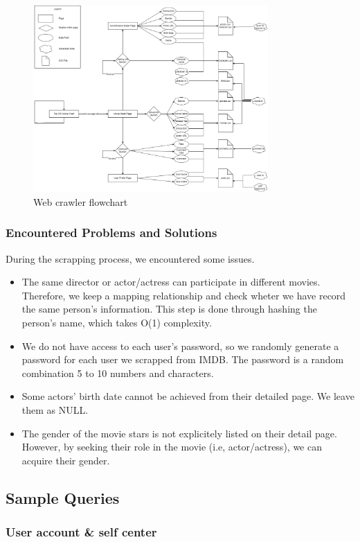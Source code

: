 \begin{CJK*}{UTF8}{gbsn}
\begin{figure}[h]
    \label{crawler}
    \centering
    \includegraphics[width=0.8\textwidth]{crawler_flowchart.png}
    \caption{Web crawler flowchart}
\end{figure}

\subsubsection{Encountered Problems and Solutions}
During the scrapping process, we encountered some issues.
\begin{itemize}
    \item The same director or actor/actress can participate in different movies. Therefore, we keep a mapping relationship and check wheter we have record the same person's information. This step is done through hashing the person's name, which takes O(1) complexity.
    \item We do not have access to each user's password, so we randomly generate a password for each user we scrapped from IMDB. The password is a random combination 5 to 10 numbers and characters.
    \item Some actors' birth date cannot be achieved from their detailed page. We leave them as NULL.
    \item The gender of the movie stars is not explicitely listed on their detail page. However, by seeking their role in the movie (i.e, actor/actress), we can acquire their gender.
\end{itemize}
\subsection{Sample Queries}
\subsubsection{User account \& self center}

\end{CJK*}
